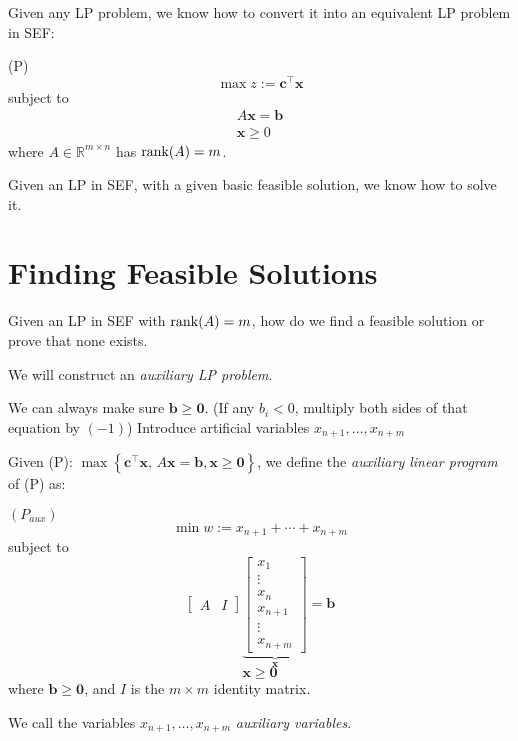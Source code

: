 Given any LP problem, we know how to convert it into an equivalent LP
problem in SEF:

(P)
\[\max z:=\bm{c}^\top \bm{x}\]
subject to
\begin{align*}
    A \bm{x}=\bm{b} \\
    \bm{x}\geqslant  0
\end{align*}
where $ A\in\mathbb{R}^{m\times n}$ has $\operatorname{rank}(A)=m $.

Given an LP in SEF, with a given basic feasible solution, we know
how to solve it.

\section{Finding Feasible Solutions}
Given an LP in SEF with $ \operatorname{rank}(A)=m $, how do we find a feasible
solution or prove that none exists.

We will construct an \emph{auxiliary LP problem}.

We can always make sure $ \bm{b}\geqslant  \bm{0} $. (If any $ b_i<0 $, multiply both
sides of that equation by $ (-1) $) Introduce artificial variables
$ x_{n+1},\ldots,x_{n+m} $

\begin{defbox}
    \begin{definition}
        Given (P): $\max \left\{ \bm{c}^\top \bm{x},\,A \bm{x}=\bm{b},\bm{x}\geqslant  \bm{0} \right\}$,
        we define the \emph{auxiliary linear program} of (P) as:

        $ (P_{aux}) $
        \[ \min w:=x_{n+1}+\cdots+x_{n+m} \]
        subject to
        \[
            \left[\begin{array}{c|c}
                    A & I
                \end{array}\right]
            \underbrace{\begin{bmatrix}
                    x_1     \\
                    \vdots  \\
                    x_{n}   \\
                    x_{n+1} \\
                    \vdots  \\
                    x_{n+m}
                \end{bmatrix}}_{\bm{x}}
            =\bm{b}\]
        \[ \bm{x} \geqslant  \bm{0}\]
        where $ \bm{b}\geqslant  \bm{0} $, and $ I $ is the $ m\times m $ identity matrix.

        We call the variables $ x_{n+1},\ldots,x_{n+m} $ \emph{auxiliary variables}.
    \end{definition}
\end{defbox}

